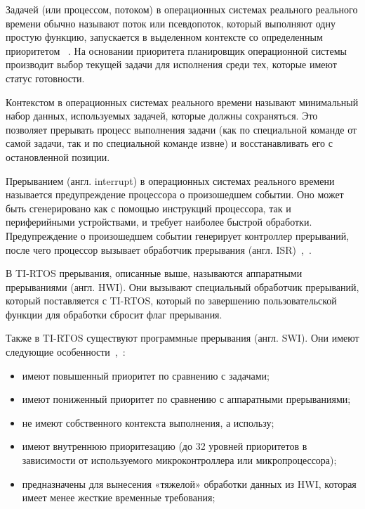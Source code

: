 Задачей (или процессом, потоком) в операционных системах реального реального времени
обычно называют поток или псевдопоток, который выполняют одну
простую функцию, запускается в выделенном контексте со определенным приоритетом
~\cite{ma_tirtos_kernel}.
На основании приоритета планировщик операционной системы производит выбор текущей
задачи для исполнения среди тех, которые имеют статус готовности.

Контекстом в операционных системах реального времени называют минимальный набор
данных, используемых задачей, которые должны сохраняться. Это позволяет прерывать
процесс выполнения задачи (как по специальной команде от самой задачи,
так и по специальной команде извне) и восстанавливать его
с остановленной позиции.%

Прерыванием (англ. interrupt) в операционных системах реального времени
называется предупреждение процессора о произошедшем событии. Оно может быть
сгенерировано как с помощью инструкций процессора, так и периферийными устройствами,
 и требует наиболее быстрой обработки.
Предупреждение о произошедшем событии генерирует контроллер прерываний,
после чего процессор вызывает обработчик прерывания
(англ. ISR)~\cite{rtos_valvano},~\cite{ma_tirtos_kernel}.


В TI-RTOS прерывания, описанные выше, называются аппаратными прерываниями (англ. HWI).
Они вызывают специальный обработчик прерываний, который поставляется с TI-RTOS,
который по завершению пользовательской функции для обработки сбросит флаг прерывания.

Также в TI-RTOS существуют программные прерывания (англ. SWI). Они имеют следующие
особенности~\cite{ma_tirtos_kernel},~\cite{tirtos_sysbios_user_guide}:
\begin{itemize}
    \item имеют повышенный приоритет по сравнению с задачами;
    \item имеют пониженный приоритет по сравнению с аппаратными прерываниями;
    \item не имеют собственного контекста выполнения, а использу;
    \item имеют внутреннюю приоритезацию (до 32 уровней приоритетов в зависимости
    от используемого микроконтроллера или микропроцессора);
    \item предназначены для вынесения «тяжелой» обработки данных из HWI,
        которая имеет менее жесткие временные требования;
\end{itemize}

